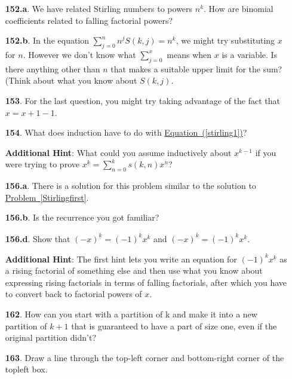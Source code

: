 \documentclass[10pt,]{book}
\theoremstyle{plain}
\theoremstyle{definition}
\theoremstyle{definition}
\numberwithin{equation}{chapter}
\begin{document}
\begin{itemize}[itemsep=1em]
\item[\textbf{152.a}.]We have related Stirling numbers to powers \(n^k\). How are binomial coefficients related to falling factorial powers?%

\item[\textbf{152.b}.]In the equation \(\sum_{j=0}^n n^{\underline{j}}S(k,j) = n^k\), we might try substituting \(x\) for \(n\). However we don't know what \(\sum_{j=0}^x\) means when \(x\) is a variable. Is there anything other than \(n\) that makes a suitable upper limit for the sum? (Think about what you know about \(S(k,j)\).%

\item[\textbf{153}.]For the last question, you might try taking advantage of the fact that \(x = x + 1 - 1\).%

\item[\textbf{154}.]What does induction have to do with \hyperref[stirling1]{Equation~(\ref{stirling1})}?%

\par\smallskip
\noindent\textbf{Additional Hint}: What could you assume inductively about \(x^{\underline{k-1}}\) if you were trying to prove \(x^{\underline{k}} = \sum_{n=0}^k s(k,n)x^n\)?%

\item[\textbf{156.a}.]There is a solution for this problem similar to the solution to \hyperref[Stirlingfirst]{Problem~\ref{Stirlingfirst}}.%

\item[\textbf{156.b}.]Is the recurrence you got familiar?%

\item[\textbf{156.d}.]Show that \((-x)^{\underline{k}} = (-1)^k x^{\overline{k}}\) and \((-x)^{\overline{k}} = (-1)^k x^{\underline{k}}\).%

\par\smallskip
\noindent\textbf{Additional Hint}: The first hint lets you write an equation for \((-1)^k x^{\underline{k}}\) as a rising factorial of something else and then use what you know about expressing rising factorials in terms of falling factorials, after which you have to convert back to factorial powers of \(x\).%

\item[\textbf{162}.]How can you start with a partition of k and make it into a new partition of \(k+1\) that is guaranteed to have a part of size one, even if the original partition didn't?%

\item[\textbf{163}.]Draw a line through the top-left corner and bottom-right corner of the topleft box.%


\end{itemize}
\end{document}

